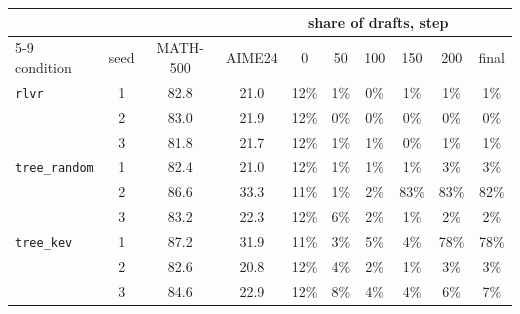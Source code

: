 \begin{tabular}{@{}lccccccccc@{}}
\toprule
& & & & \multicolumn{5}{c}{share of drafts, step} & \\ \cmidrule(lr){5-9}
condition & seed & MATH-500 & AIME24 & 0 & 50 & 100 & 150 & 200 & final \\ \midrule
\texttt{rlvr} & 1 & 82.8 & 21.0 & 12\% & 1\% & 0\% & 1\% & 1\% & 1\% \\
 & 2 & 83.0 & 21.9 & 12\% & 0\% & 0\% & 0\% & 0\% & 0\% \\
 & 3 & 81.8 & 21.7 & 12\% & 1\% & 1\% & 0\% & 1\% & 1\% \\
\addlinespace
\texttt{tree\_random} & 1 & 82.4 & 21.0 & 12\% & 1\% & 1\% & 1\% & 3\% & 3\% \\
 & 2 & 86.6 & 33.3 & 11\% & 1\% & 2\% & 83\% & 83\% & 82\% \\
 & 3 & 83.2 & 22.3 & 12\% & 6\% & 2\% & 1\% & 2\% & 2\% \\
\addlinespace
\texttt{tree\_kev} & 1 & 87.2 & 31.9 & 11\% & 3\% & 5\% & 4\% & 78\% & 78\% \\
 & 2 & 82.6 & 20.8 & 12\% & 4\% & 2\% & 1\% & 3\% & 3\% \\
 & 3 & 84.6 & 22.9 & 12\% & 8\% & 4\% & 4\% & 6\% & 7\% \\
\bottomrule
\end{tabular}
